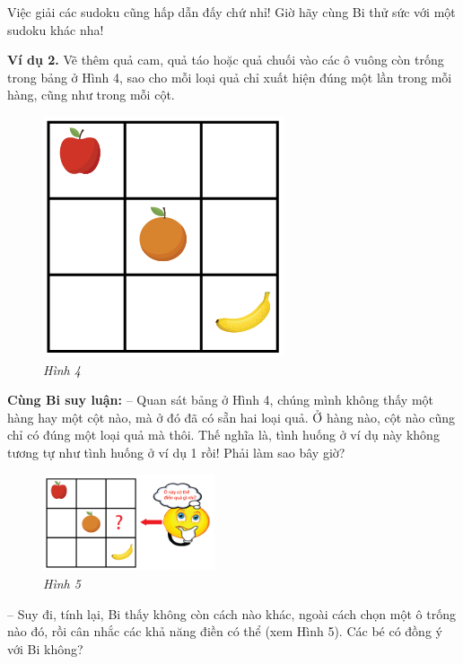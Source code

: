 	Việc giải các sudoku cũng hấp dẫn đấy chứ nhỉ! Giờ hãy cùng Bi thử sức với một sudoku  khác nha!
	\begin{multicols}{2}
		\textbf{Ví dụ 2.} Vẽ thêm quả cam, quả táo hoặc quả chuối vào các ô vuông còn trống trong bảng ở Hình 4, sao cho mỗi loại quả chỉ xuất hiện đúng một lần trong mỗi hàng, cũng như trong mỗi cột.
		\begin{figure}[H]
			\vspace*{5pt}
			\centering
			\captionsetup{labelformat=empty, justification=centering}
			\includegraphics[scale=0.4]{hinh4}
			\caption{\textit{\small Hình 4}}
			\vspace*{-10pt}
		\end{figure}
	\end{multicols}
	\textbf{Cùng Bi suy luận:}
	\vskip 0.15cm
	-- Quan sát bảng ở Hình 4, chúng mình không thấy một hàng hay một cột nào, mà ở đó đã có sẵn hai loại quả. Ở hàng nào, cột nào cũng chỉ có đúng một loại quả mà thôi. Thế nghĩa là,  tình huống ở ví dụ này không tương tự như tình huống ở ví dụ 1 rồi! Phải làm sao bây giờ?
	\begin{multicols}{2}
			\begin{figure}[H]
			\centering
			\vspace*{-5pt}
			\captionsetup{labelformat= empty, justification=centering}
			\includegraphics[width=0.45\textwidth]{hinh5}
			\caption{\small\textit{Hình 5}}
			\vspace*{-5pt}
		\end{figure}
		-- Suy đi, tính lại, Bi thấy không còn cách nào khác, ngoài cách chọn một ô trống nào đó, rồi cân nhắc các khả năng điền có thể (xem Hình 5). Các bé có đồng ý với Bi không?
	\end{multicols}
